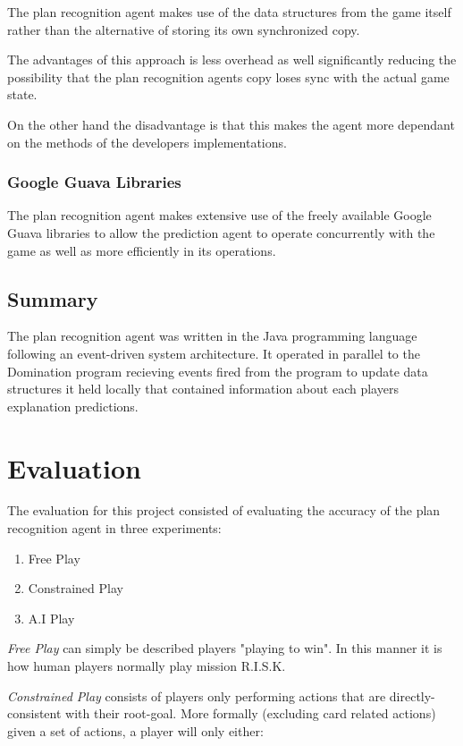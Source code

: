 \documentclass[parskip]{cs4rep}
\begin{document}
The plan recognition agent makes use of the data structures from the game itself rather than the alternative of storing its own synchronized copy.

The advantages of this approach is less overhead as well significantly reducing the possibility that the plan recognition agents copy loses sync with the actual game state. 

On the other hand the disadvantage is that this makes the agent more dependant on the methods of the developers implementations.

\subsection{Google Guava Libraries}

The plan recognition agent makes extensive use of the freely available Google Guava libraries to allow the prediction agent to operate concurrently with the game as well as more efficiently in its operations.

\section{Summary}

The plan recognition agent was written in the Java programming language following an event-driven system architecture. It operated in parallel to the Domination program recieving events fired from the program to update data structures it held locally that contained information about each players explanation predictions.

\chapter{Evaluation} 

The evaluation for this project consisted of evaluating the accuracy of the plan recognition agent in three experiments:

\begin{enumerate}
\item
Free Play
\item
Constrained Play
\item
A.I Play
\end{enumerate}

\textit{Free Play} can simply be described players "playing to win". In this manner it is how human players normally play mission R.I.S.K.

\textit{Constrained Play} consists of players only performing actions that are directly-consistent with their root-goal.  More formally (excluding card related actions) given a set of actions, a player will only either:
\end{document}
